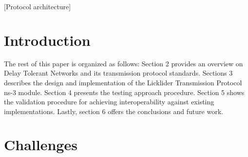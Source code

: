 \documentclass{sig-alternate}
\begin{document}

\maketitle
\begin{abstract}
This paper describes the design, implementation and validation
of the ns-3 model of the Licklider Transmission Protocol, the standard
transport protocol used to provide transmission reliability in Delay Tolerant Networks (DTNs).
DTNs are an emerging field whose principles are used to provide communications 
in extreme and performance-challenged environments, such as spacrecraft,underwater, or
disaster response scenarios. Evaluation of such environments requires the use of simulation tools.
As of now, there is a lack of precise simulation models of these protocols, and concretely within the ns-3 simulator.
The ns-3 model presented in this paper accurately models the LTP protocol and offers ...
\end{abstract}

 [Protocol architecture]



\section{Introduction}

The rest of this paper is organized as follows: Section 2 provides an overview on Delay Tolerant
Networks and its transmission protocol standards. Sections 3 describes the design and implementation of the Licklider
Transmission Protocol ns-3 module. Section 4 presents the testing approach procedure. Section 5 shows
the validation procedure for achieving interoperability against existing implementations. Lastly, section 6 offers the conclusions and future work.


\section{Challenges}
\end{document}
